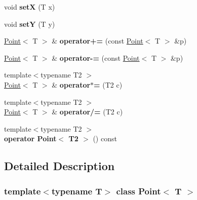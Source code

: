 \begin{DoxyCompactItemize}
\item 
\hypertarget{class_point_a0e395ed682dce1b506117001ad7b4359}{
void {\bfseries setX} (T x)}
\label{class_point_a0e395ed682dce1b506117001ad7b4359}

\item 
\hypertarget{class_point_af95aee5daa3bc93b4eb31867f4be5a2b}{
void {\bfseries setY} (T y)}
\label{class_point_af95aee5daa3bc93b4eb31867f4be5a2b}

\item 
\hypertarget{class_point_a2c82fe84181ba81c0cb13f42b2e5f8f6}{
\hyperlink{class_point}{Point}$<$ T $>$ \& {\bfseries operator+=} (const \hyperlink{class_point}{Point}$<$ T $>$ \&p)}
\label{class_point_a2c82fe84181ba81c0cb13f42b2e5f8f6}

\item 
\hypertarget{class_point_a97420680779305d8ff418154432d18e6}{
\hyperlink{class_point}{Point}$<$ T $>$ \& {\bfseries operator-\/=} (const \hyperlink{class_point}{Point}$<$ T $>$ \&p)}
\label{class_point_a97420680779305d8ff418154432d18e6}

\item 
\hypertarget{class_point_af661fc31fd0d5e68272dd0b5fd89c098}{
{\footnotesize template$<$typename T2 $>$ }\\\hyperlink{class_point}{Point}$<$ T $>$ \& {\bfseries operator$\ast$=} (T2 c)}
\label{class_point_af661fc31fd0d5e68272dd0b5fd89c098}

\item 
\hypertarget{class_point_a1eea2586fd60dc3afd91fa48a2243d34}{
{\footnotesize template$<$typename T2 $>$ }\\\hyperlink{class_point}{Point}$<$ T $>$ \& {\bfseries operator/=} (T2 c)}
\label{class_point_a1eea2586fd60dc3afd91fa48a2243d34}

\item 
\hypertarget{class_point_ae81e26af57b63fc89ed704b1035cf149}{
{\footnotesize template$<$typename T2 $>$ }\\{\bfseries operator Point$<$ T2 $>$} () const }
\label{class_point_ae81e26af57b63fc89ed704b1035cf149}

\end{DoxyCompactItemize}


\subsection{Detailed Description}
\subsubsection*{template$<$typename T$>$ class Point$<$ T $>$}



